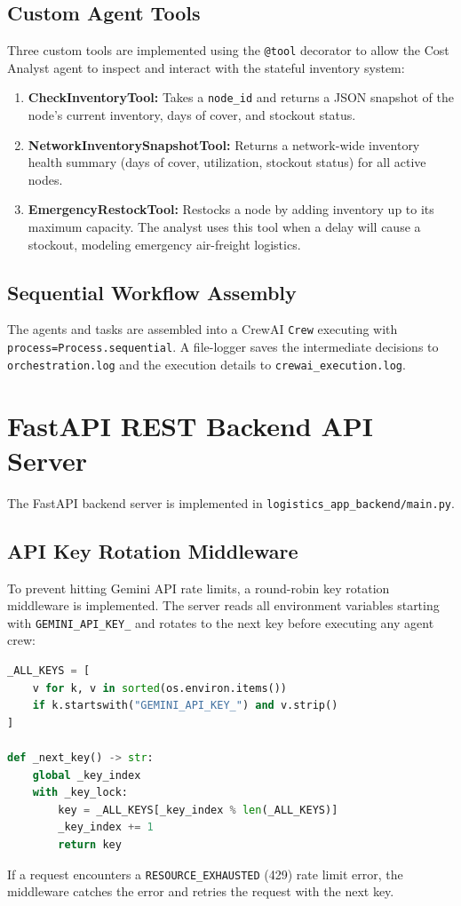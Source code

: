 \subsection{Custom Agent Tools}
Three custom tools are implemented using the \texttt{@tool} decorator to allow the Cost Analyst agent to inspect and interact with the stateful inventory system:
\begin{enumerate}
    \item \textbf{CheckInventoryTool:} Takes a \texttt{node\_id} and returns a JSON snapshot of the node's current inventory, days of cover, and stockout status.
    \item \textbf{NetworkInventorySnapshotTool:} Returns a network-wide inventory health summary (days of cover, utilization, stockout status) for all active nodes.
    \item \textbf{EmergencyRestockTool:} Restocks a node by adding inventory up to its maximum capacity. The analyst uses this tool when a delay will cause a stockout, modeling emergency air-freight logistics.
\end{enumerate}

\subsection{Sequential Workflow Assembly}
The agents and tasks are assembled into a CrewAI \texttt{Crew} executing with \texttt{process=Process.sequential}. A file-logger saves the intermediate decisions to \texttt{orchestration.log} and the execution details to \texttt{crewai\_execution.log}.

\section{FastAPI REST Backend API Server}
The FastAPI backend server is implemented in \texttt{logistics\_app_backend/main.py}.

\subsection{API Key Rotation Middleware}
To prevent hitting Gemini API rate limits, a round-robin key rotation middleware is implemented. The server reads all environment variables starting with \texttt{GEMINI\_API\_KEY\_} and rotates to the next key before executing any agent crew:
\begin{lstlisting}[language=Python]
_ALL_KEYS = [
    v for k, v in sorted(os.environ.items())
    if k.startswith("GEMINI_API_KEY_") and v.strip()
]

def _next_key() -> str:
    global _key_index
    with _key_lock:
        key = _ALL_KEYS[_key_index % len(_ALL_KEYS)]
        _key_index += 1
        return key
\end{lstlisting}
If a request encounters a \texttt{RESOURCE\_EXHAUSTED} (429) rate limit error, the middleware catches the error and retries the request with the next key.

